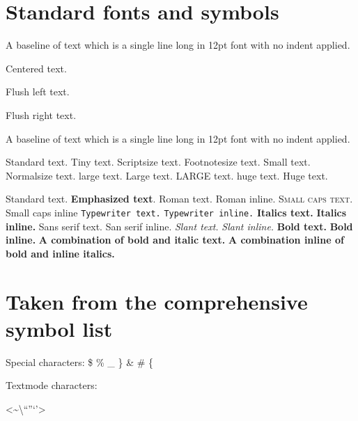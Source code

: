 \documentclass[12pt,a4paper]{article}
\renewcommand{\textit}{\textbf}
\renewcommand{\emph}{\textbf}
\renewcommand{\it}{\bf }
\theoremstyle{clearprint}
\begin{document}
\section[Standard fonts and symbols]{Standard fonts and symbols}
\setcounter{equation}{0}

\noindent
A baseline of text which is a single line long in 12pt font with no indent applied.

\begin{center}
Centered text.
\end{center}

\begin{flushleft}
Flush left text.
\end{flushleft}

\begin{flushright}
Flush right text.
\end{flushright}

\noindent
A baseline of text which is a single line long in 12pt font with no indent applied.

Standard text. {\tiny Tiny text.} {\scriptsize Scriptsize text.} {\footnotesize Footnotesize text.} {\small Small text.} {\normalsize Normalsize text.} {\large large text.} {\Large Large text.} {\LARGE LARGE text.} {\huge huge text.} {\Huge Huge text.}

Standard text. \emph{Emphasized text}. \textrm{Roman text.} {\rm Roman inline.} \textsc{Small caps text.} {\sc Small caps inline} \texttt{Typewriter text.} {\tt Typewriter inline.} \textit{Italics text.} {\it Italics inline.} \textsf{Sans serif text.} {\sf San serif inline.} \textsl{Slant text.} {\sl Slant inline.}  \textbf{Bold text.} {\bf Bold inline.} \textbf{A combination of bold and \textit{italic text.}} {\bf A combination inline of bold {\it and inline italics}.}

\newpage

\section[Comprehensive symbol list]{Taken from the comprehensive symbol list}
\setcounter{equation}{0}

\noindent
Special characters: \$  \%  \_  \}  \&  \#  \{

\noindent
Textmode characters: 
\par\noindent
\textless  \textasciitilde  \textordfeminine  \textordmasculine  \textbackslash  \textparagraph  \textbar  \textperiodcentered  \textbraceleft  \textquestiondown  \textbraceright  \textquotedblleft  \textbullet  \textquotedblright  \textquoteleft  \textdagger  \textquoteright  \textdaggerdbl  \textregistered  \textdollar  \textsection  \textellipsis  \textsterling  \textemdash  \texttrademark  \textendash  \textunderscore  \textexclamdown  \textgreater                                                      
\end{document}
